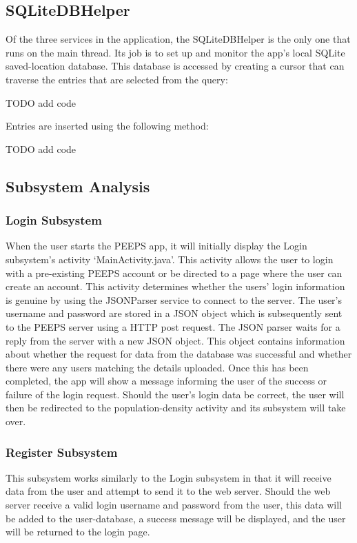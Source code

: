 \subsection{SQLiteDBHelper}
Of the three services in the application, the SQLiteDBHelper is the only one that runs on the main thread. Its job is to set up and monitor the app’s local SQLite saved-location database. This database is accessed by creating a cursor that can traverse the entries that are selected from the query: 

TODO add code

Entries are inserted using the following method:

TODO add code

\subsection{Subsystem Analysis}
\subsubsection{Login Subsystem}
When the user starts the PEEPS app, it will initially display the Login subsystem’s activity ‘MainActivity.java’. This activity allows the user to login with a pre-existing PEEPS account or be directed to a page where the user can create an account. This activity determines whether the users’ login information is genuine by using the JSONParser service to connect to the server. The user’s username and password are stored in a JSON object which is subsequently sent to the PEEPS server using a HTTP post request. The JSON parser waits for a reply from the server with a new JSON object. This object contains information about whether the request for data from the database was successful and whether there were any users matching the details uploaded. Once this has been completed, the app will show a message informing the user of the success or failure of the login request. Should the user’s login data be correct, the user will then be redirected to the population-density activity and its subsystem will take over.

\subsubsection{Register Subsystem}
This subsystem works similarly to the Login subsystem in that it will receive data from the user and attempt to send it to the web server. Should the web server receive a valid login username and password from the user, this data will be added to the user-database, a success message will be displayed, and the user will be returned to the login page. 

